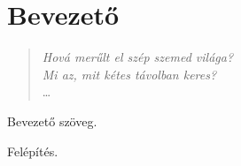 \chapter*{Bevezető}

\begin{verse}
\begin{flushright}
\emph{Hová merűlt el szép szemed világa? \\
Mi az, mit kétes távolban keres?} \\
\dots
\end{flushright}
\end{verse}

Bevezető szöveg.

\bigskip

Felépítés.